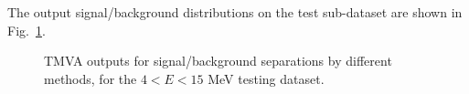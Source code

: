 The output signal/background distributions on the test sub-dataset are shown in Fig.~\ref{output_separation_allE}.
\begin{figure}[htbp]
	\centering
	\caption[TMVA outputs for signal/background separations by different methods.]{TMVA outputs for signal/background separations by different methods, for the $4<E<15$ MeV testing dataset.\label{output_separation_allE}}
\end{figure}

